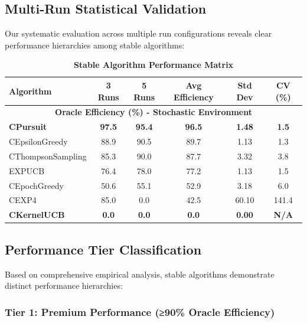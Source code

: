 \documentclass[12pt,a4paper]{article}
\newcommand{\performance}[1]{\textcolor{performancecolor}{\textbf{#1}}}
\newcommand{\critical}[1]{\textcolor{criticalcolor}{\textbf{#1}}}
\begin{document}
\begin{tcolorbox}[colback=performancecolor!10,colframe=performancecolor,title=\textbf{Primary Performance Analysis - Stable Algorithms}]

\subsection{Multi-Run Statistical Validation}

Our systematic evaluation across multiple run configurations reveals clear performance hierarchies among stable algorithms:

\begin{table}[H]
\centering
\caption{\performance{Stable Algorithm Performance Matrix}}
\begin{tabular}{|l|c|c|c|c|c|}
\hline
\textbf{Algorithm} & \textbf{3 Runs} & \textbf{5 Runs} & \textbf{Avg Efficiency} & \textbf{Std Dev} & \textbf{CV (\%)} \\
\hline
\hline
\multicolumn{6}{|c|}{\textbf{Oracle Efficiency (\%) - Stochastic Environment}} \\
\hline
\performance{CPursuit} & \performance{97.5} & \performance{95.4} & \performance{\textbf{96.5}} & \performance{1.48} & \performance{\textbf{1.5}} \\
CEpsilonGreedy & 88.9 & 90.5 & 89.7 & 1.13 & 1.3 \\
CThompsonSampling & 85.3 & 90.0 & 87.7 & 3.32 & 3.8 \\
EXPUCB & 76.4 & 78.0 & 77.2 & 1.13 & 1.5 \\
CEpochGreedy & 50.6 & 55.1 & 52.9 & 3.18 & 6.0 \\
CEXP4 & 85.0 & 0.0 & 42.5 & 60.10 & 141.4 \\
\critical{CKernelUCB} & \critical{0.0} & \critical{0.0} & \critical{0.0} & \critical{0.00} & \critical{N/A} \\
\hline
\end{tabular}
\end{table}

\end{tcolorbox}

\subsection{Performance Tier Classification}

Based on comprehensive empirical analysis, stable algorithms demonstrate distinct performance hierarchies:

\subsubsection{Tier 1: Premium Performance (≥90\% Oracle Efficiency)}
\end{document}
